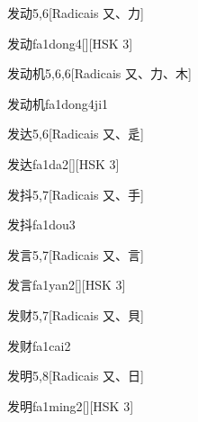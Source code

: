 \begin{entry}{发动}{5,6}[Radicais ⼜、⼒]
  \begin{phonetics}{发动}{fa1dong4}[][HSK 3]
  \end{phonetics}
\end{entry}

\begin{entry}{发动机}{5,6,6}[Radicais ⼜、⼒、⽊]
  \begin{phonetics}{发动机}{fa1dong4ji1}
  \end{phonetics}
\end{entry}

\begin{entry}{发达}{5,6}[Radicais ⼜、⾡]
  \begin{phonetics}{发达}{fa1da2}[][HSK 3]
  \end{phonetics}
\end{entry}

\begin{entry}{发抖}{5,7}[Radicais ⼜、⼿]
  \begin{phonetics}{发抖}{fa1dou3}
  \end{phonetics}
\end{entry}

\begin{entry}{发言}{5,7}[Radicais ⼜、⾔]
  \begin{phonetics}{发言}{fa1yan2}[][HSK 3]
  \end{phonetics}
\end{entry}

\begin{entry}{发财}{5,7}[Radicais ⼜、⾙]
  \begin{phonetics}{发财}{fa1cai2}
  \end{phonetics}
\end{entry}

\begin{entry}{发明}{5,8}[Radicais ⼜、⽇]
  \begin{phonetics}{发明}{fa1ming2}[][HSK 3]
  \end{phonetics}
\end{entry}

